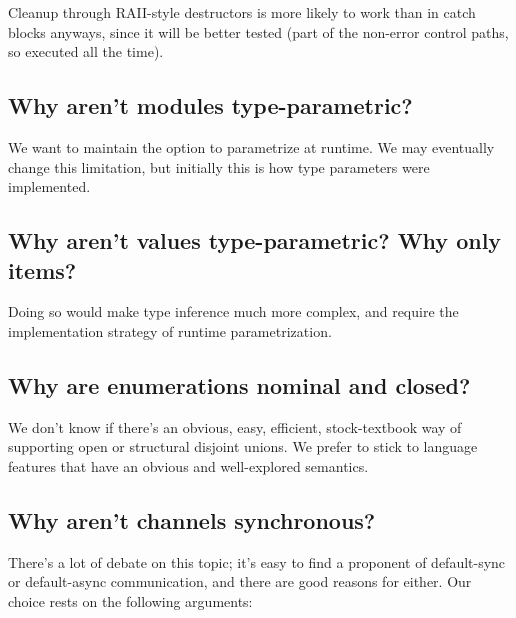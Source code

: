 \documentclass[]{article}
\begin{document}
Cleanup through RAII-style destructors is more likely to work than in
catch blocks anyways, since it will be better tested (part of the
non-error control paths, so executed all the time).

\subsection{Why aren't modules
type-parametric?}\label{why-arent-modules-type-parametric}

We want to maintain the option to parametrize at runtime. We may
eventually change this limitation, but initially this is how type
parameters were implemented.

\subsection{Why aren't values type-parametric? Why only
items?}\label{why-arent-values-type-parametric-why-only-items}

Doing so would make type inference much more complex, and require the
implementation strategy of runtime parametrization.

\subsection{Why are enumerations nominal and
closed?}\label{why-are-enumerations-nominal-and-closed}

We don't know if there's an obvious, easy, efficient, stock-textbook way
of supporting open or structural disjoint unions. We prefer to stick to
language features that have an obvious and well-explored semantics.

\subsection{Why aren't channels
synchronous?}\label{why-arent-channels-synchronous}

There's a lot of debate on this topic; it's easy to find a proponent of
default-sync or default-async communication, and there are good reasons
for either. Our choice rests on the following arguments:
\end{document}
